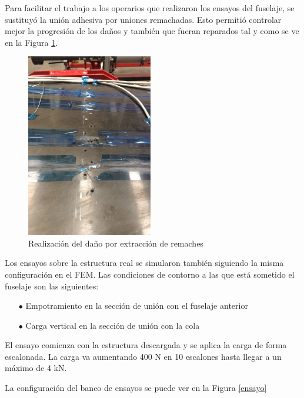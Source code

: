 Para facilitar el trabajo a los operarios que realizaron los ensayos del fuselaje, se sustituyó la unión adhesiva por uniones remachadas. Esto permitió controlar mejor la progresión de los daños y también que fueran reparados tal y como se ve en la Figura \ref{remaches}.

\begin{figure}[ht]
    \centering
    \includegraphics[width=55mm]{3/Fotos/remaches.png}
    \captionsetup{justification=centering,margin=1.25cm}
    \caption{Realización del daño por extracción de remaches}
    \label{remaches}
\end{figure}

Los ensayos sobre la estructura real se simularon también siguiendo la misma configuración en el FEM. Las condiciones de contorno a las que está sometido el fuselaje son las siguientes:

\begin{itemize}
    \item[\tiny$\bullet$] Empotramiento en la sección de unión con el fuselaje anterior
    \item[\tiny$\bullet$] Carga vertical en la sección de unión con la cola
\end{itemize}

El ensayo comienza con la estructura descargada y se aplica la carga de forma escalonada. La carga va aumentando 400 N en 10 escalones hasta llegar a un máximo de 4 kN.

La configuración del banco de ensayos se puede ver en la Figura \ref{ensayo}

